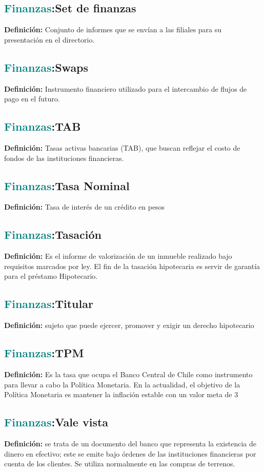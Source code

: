 \documentclass[12pt]{article}
\begin{document}
\subsection{\textcolor{teal}{Finanzas}:{Set de finanzas}}
\textbf{Definición:} Conjunto de informes que se envían a las filiales para su presentación en el directorio.
\subsection{\textcolor{teal}{Finanzas}:{Swaps}}
\textbf{Definición:} Instrumento financiero utilizado para el intercambio de flujos de pago en el futuro.
\subsection{\textcolor{teal}{Finanzas}:{TAB}}
\textbf{Definición:} Tasas activas bancarias (TAB), que buscan reflejar el costo de fondos de las instituciones financieras.
\subsection{\textcolor{teal}{Finanzas}:{Tasa Nominal}}
\textbf{Definición:} Tasa de interés de un crédito en pesos
\subsection{\textcolor{teal}{Finanzas}:{Tasación}}
\textbf{Definición:} Es el informe de valorización de un inmueble realizado bajo requisitos marcados por ley. El fin de la tasación hipotecaria es servir de garantía para el préstamo Hipotecario.
\subsection{\textcolor{teal}{Finanzas}:{Titular}}
\textbf{Definición:} sujeto que puede ejercer, promover y exigir un derecho hipotecario
\subsection{\textcolor{teal}{Finanzas}:{TPM}}
\textbf{Definición:} Es la tasa que ocupa el Banco Central de Chile como instrumento para llevar a cabo la Política Monetaria. En la actualidad, el objetivo de la Política Monetaria es mantener la inflación estable con un valor meta de 3%
\subsection{\textcolor{teal}{Finanzas}:{Vale vista}}
\textbf{Definición:} se trata de un documento del banco que representa la existencia de dinero en efectivo; este se emite bajo órdenes de las instituciones financieras por cuenta de los clientes. Se utiliza normalmente en las compras de terrenos.
\end{document}

